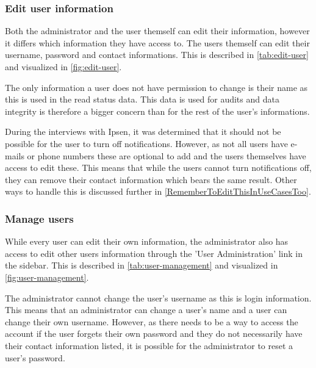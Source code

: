 \subsubsection{Edit user information}
Both the administrator and the user themself can edit their information, however it differs which information they have access to.
The users themself can edit their username, password and contact informations.
This is described in \cref{tab:edit-user} and visualized in \cref{fig:edit-user}.




The only information a user does not have permission to change is their name as this is used in the read status data.
This data is used for audits and data integrity is therefore a bigger concern than for the rest of the user's informations.

During the interviews with Ipsen, it was determined that it should not be possible for the user to turn off notifications.
However, as not all users have e-mails or phone numbers these are optional to add and the users themselves have access to edit these.
This means that while the users cannot turn notifications off, they can remove their contact information which bears the same result.
Other ways to handle this is discussed further in \cref{RememberToEditThisInUseCasesToo}.

\subsubsection{Manage users}
While every user can edit their own information, the administrator also has access to edit other users information through the 'User Administration' link in the sidebar.
This is described in \cref{tab:user-management} and visualized in \cref{fig:user-management}.




The administrator cannot change the user's username as this is login information.
This means that an administrator can change a user's name and a user can change their own username.
However, as there needs to be a way to access the account if the user forgets their own password and they do not necessarily have their contact information listed, it is possible for the administrator to reset a user's password.


